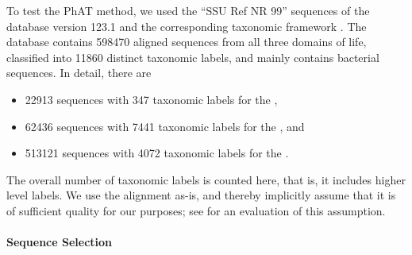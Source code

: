 To test the \acf{PhAT} method,
we used the ``SSU Ref NR 99'' sequences of the  database \cite{Quast2013} version 123.1
and the corresponding taxonomic framework \cite{Yilmaz2014}.
The database contains \num{598 470} aligned sequences from all three domains of life,
classified into \num{11 860} distinct taxonomic labels,
and mainly contains bacterial sequences.
In detail, there are
\begin{itemize}
    \item \num{ 22 913} sequences with \num{  347} taxonomic labels for the ,
    \item \num{ 62 436} sequences with \num{7 441} taxonomic labels for the , and
    \item \num{513 121} sequences with \num{4 072} taxonomic labels for the .
\end{itemize}
The overall number of taxonomic labels is counted here, that is, it includes higher level labels.
We use the  alignment as-is,
and thereby implicitly assume that it is of sufficient quality for our purposes;
see 
for an evaluation of this assumption.



\paragraph{Sequence Selection}
\label{ch:AutomaticTrees:sec:Evaluation:sub:ReferenceTreeSetup:par:SequenceSelection}

